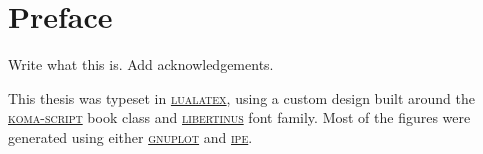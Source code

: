 \chapter*{Preface}\noindent
Write what this is. Add acknowledgements.


This thesis was typeset in \href{http://www.luatex.org/}{\textsc{lualatex}}, using a custom design built around the \href{https://ctan.org/pkg/koma-script?lang=en}{\textsc{koma-script}} book class and \href{https://github.com/khaledhosny/libertinus}{\textsc{libertinus}} font family.
Most of the figures were generated using either \href{http://www.gnuplot.info/}{\textsc{gnuplot}} and \href{https://ipe.otfried.org/}{\textsc{ipe}}.
